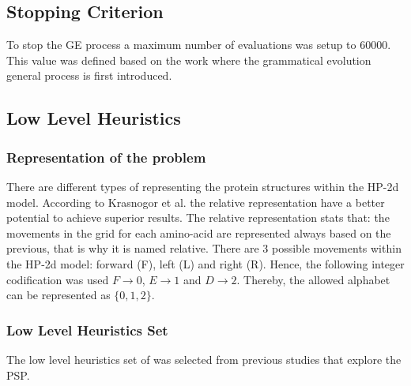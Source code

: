 \documentclass[conference]{IEEEtran}
\begin{document}
\subsection{Stopping Criterion}
\label{sub:criterioParada}

To stop the GE process a maximum number of evaluations was setup to 60000. This value was defined based on the work  \cite{ryan1998grammatical} where the grammatical evolution general process is first introduced.

  
  \subsection{Low Level Heuristics} 
  
  \subsubsection{Representation of the problem} 
  There are different types of representing the protein structures within the HP-2d model. According to Krasnogor et al. \cite{krasnogor1999protein}  the relative representation have a better potential to achieve superior results. The relative representation stats that: the movements in the grid for each amino-acid are represented always based on the previous, that is why it is named relative. There are 3 possible movements within the HP-2d model: forward (F), left (L) and right (R). Hence, the following integer codification was used $F\rightarrow0$, $E\rightarrow1$ and $D\rightarrow2$. Thereby, the allowed alphabet can be represented as $\{0,1,2\}$.  

  \subsubsection{Low Level Heuristics Set}
 The low level heuristics set of was selected from previous studies \cite{benitez2015algoritmo,custodio2014multiple, custodio2004investigation, garza2012multiobjectivizing} that explore the PSP.
 
\end{document}
